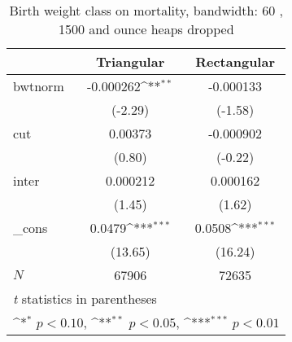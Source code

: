 \begin{table}[htbp]\centering
\def\sym#1{\ifmmode^{#1}\else\(^{#1}\)\fi}
\caption{Birth weight class on mortality, bandwidth: 60 , 1500 and ounce heaps dropped}
\begin{tabular}{l*{2}{c}}
\hline\hline
            &\multicolumn{1}{c}{Triangular}&\multicolumn{1}{c}{Rectangular}\\
\hline
bwtnorm     &   -0.000262\sym{**} &   -0.000133         \\
            &     (-2.29)         &     (-1.58)         \\
[1em]
cut         &     0.00373         &   -0.000902         \\
            &      (0.80)         &     (-0.22)         \\
[1em]
inter       &    0.000212         &    0.000162         \\
            &      (1.45)         &      (1.62)         \\
[1em]
\_cons      &      0.0479\sym{***}&      0.0508\sym{***}\\
            &     (13.65)         &     (16.24)         \\
\hline
\(N\)       &       67906         &       72635         \\
\hline\hline
\multicolumn{3}{l}{\footnotesize \textit{t} statistics in parentheses}\\
\multicolumn{3}{l}{\footnotesize \sym{*} \(p<0.10\), \sym{**} \(p<0.05\), \sym{***} \(p<0.01\)}\\
\end{tabular}
\end{table}
